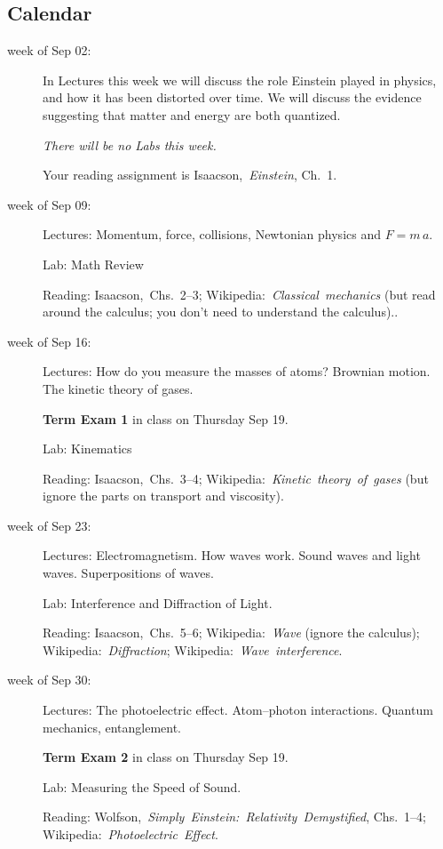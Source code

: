 \documentclass[12pt]{article}
\begin{document}
\subsection*{Calendar}\raggedright
\begin{description}
\item[week of Sep 02:] In Lectures this week we will discuss the role
  Einstein played in physics, and how it has been distorted over
  time. We will discuss the evidence suggesting that matter and energy
  are both quantized.

  \textsl{There will be no Labs this week.}

  Your reading assignment is
  Isaacson,~\textit{Einstein}, Ch.~1.

\item[week of Sep 09:] Lectures: Momentum, force, collisions,
  Newtonian physics and $F=m\,a$.

  Lab: Math Review

  Reading: Isaacson,~Chs.~2--3;
  Wikipedia:~\textit{Classical~mechanics} (but read around the
  calculus; you don't need to understand the calculus)..

\item[week of Sep 16:] Lectures: How do you measure the masses of
  atoms? Brownian motion. The kinetic theory of gases.

  \textbf{Term Exam 1} in class on Thursday Sep 19.

  Lab: Kinematics

  Reading: Isaacson,~Chs.~3--4;
  Wikipedia:~\textit{Kinetic~theory~of~gases} (but ignore the parts on
  transport and viscosity).

\item[week of Sep 23:] Lectures: Electromagnetism. How waves
  work. Sound waves and light waves. Superpositions of waves.

  Lab: Interference and Diffraction of Light.

  Reading:
  Isaacson,~Chs.~5--6;
  Wikipedia:~\textit{Wave} (ignore the calculus);
  Wikipedia:~\textit{Diffraction};
  Wikipedia:~\textit{Wave~interference}.

\item[week of Sep 30:] Lectures: The photoelectric effect.
  Atom--photon interactions. Quantum mechanics, entanglement.

  \textbf{Term Exam 2} in class on Thursday Sep 19.

  Lab: Measuring the Speed of Sound.

  Reading:
  Wolfson,~\textit{Simply~Einstein:~Relativity~Demystified}, Chs.~1--4;
  Wikipedia:~\textit{Photoelectric~Effect}.


\end{description}
\end{document}
